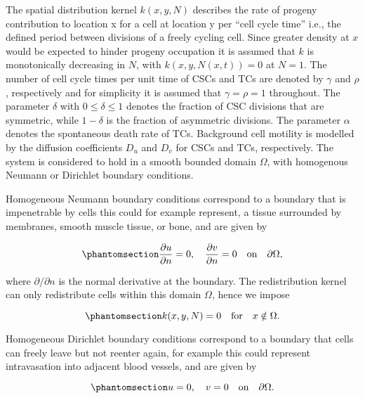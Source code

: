 \documentclass[
  letterpaper,
]{scrreprt}
\theoremstyle{definition}
\theoremstyle{remark}
\begin{document}
The spatial distribution kernel \(k(x,y,N)\) describes the rate of
progeny contribution to location x for a cell at location y per ``cell
cycle time'' i.e., the defined period between divisions of a freely
cycling cell. Since greater density at \(x\) would be expected to hinder
progeny occupation it is assumed that \(k\) is monotonically decreasing
in \(N\), with \(k(x,y,N(x,t))=0\) at \(N=1\). The number of cell cycle
times per unit time of CSCs and TCs are denoted by \(\gamma\) and
\(\rho\), respectively and for simplicity it is assumed that
\(\gamma = \rho = 1\) throughout. The parameter \(\delta\) with
\(0 \leq \delta \leq 1\) denotes the fraction of CSC divisions that are
symmetric, while \(1-\delta\) is the fraction of asymmetric divisions.
The parameter \(\alpha\) denotes the spontaneous death rate of TCs.
Background cell motility is modelled by the diffusion coefficients
\(D_u\) and \(D_v\) for CSCs and TCs, respectively. The system is
considered to hold in a smooth bounded domain \(\Omega\), with
homogenous Neumann or Dirichlet boundary conditions.

Homogeneous Neumann boundary conditions correspond to a boundary that is
impenetrable by cells this could for example represent, a tissue
surrounded by membranes, smooth muscle tissue, or bone, and are given by

\begin{equation}\phantomsection\label{eq-homogeneous-neumann-boundary-conditions}{
\frac{\partial u}{\partial n} = 0, \quad \frac{\partial v}{\partial n} = 0 \quad \text{on} \quad \partial \Omega,
}\end{equation}

where \(\partial / \partial n\) is the normal derivative at the
boundary. The redistribution kernel can only redistribute cells within
this domain \(\Omega\), hence we impose

\begin{equation}\phantomsection\label{eq-redistribution-kernel-neumann-BC}{
k(x,y,N) = 0 \quad \text{for} \quad x \notin \Omega. 
}\end{equation}

Homogeneous Dirichlet boundary conditions correspond to a boundary that
cells can freely leave but not reenter again, for example this could
represent intravasation into adjacent blood vessels, and are given by

\begin{equation}\phantomsection\label{eq-homogeneous-dirichlet-boundary-conditions}{
u = 0, \quad v = 0 \quad \text{on} \quad \partial \Omega.
}\end{equation}
\end{document}
